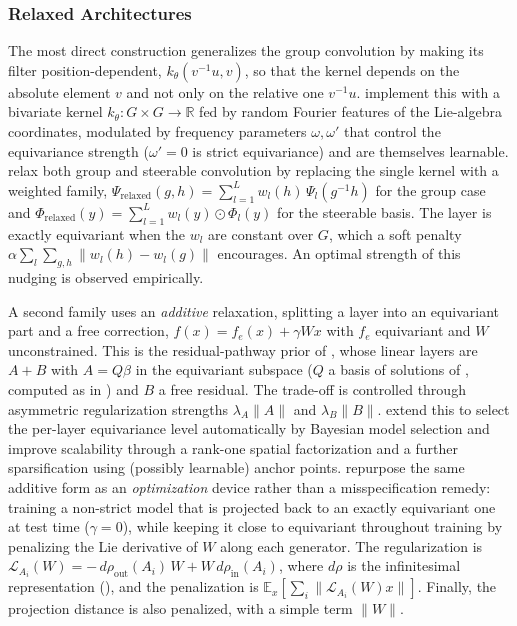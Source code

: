 \documentclass[mathematics,review,submit,moreauthors]{Definitions/mdpi}
\begin{document}
\subsubsection{Relaxed Architectures}\label{sec:approx-relaxed}
The most direct construction generalizes the group convolution by making its filter position-dependent, $k_\theta(v^{-1}u,v)$, so that the kernel depends on the absolute element $v$ and not only on the relative one $v^{-1}u$.
\citet{ouderaa2022} implement this with a bivariate kernel $k_\theta:G\times G\to\mathbb{R}$ fed by random Fourier features of the Lie-algebra coordinates, modulated by frequency parameters $\omega,\omega'$ that control the equivariance strength ($\omega'=0$ is strict equivariance) and are themselves learnable.
\citet{wang2022p3icml} relax both group and steerable convolution by replacing the single kernel with a weighted family, $\Psi_{\mathrm{relaxed}}(g,h)=\sum_{l=1}^{L}w_l(h)\,\Psi_l(g^{-1}h)$ for the group case and $\Phi_{\mathrm{relaxed}}(y)=\sum_{l=1}^{L}w_l(y)\odot\Phi_l(y)$ for the steerable basis.
The layer is exactly equivariant when the $w_l$ are constant over $G$, which a soft penalty $\alpha\sum_{l}\sum_{g,h}\|w_l(h)-w_l(g)\|$ encourages.
An optimal strength of this nudging is observed empirically.

A second family uses an \emph{additive} relaxation, splitting a layer into an equivariant part and a free correction, $f(x)=f_e(x)+\gamma Wx$ with $f_e$ equivariant and $W$ unconstrained.
This is the residual-pathway prior of \citet{finzi2021anips}, whose linear layers are $A+B$ with $A=Q\beta$ in the equivariant subspace ($Q$ a basis of solutions of , computed as in \citet{finzi2021p3icml}) and $B$ a free residual.
The trade-off is controlled through asymmetric regularization strengths $\lambda_A\|A\|$ and $\lambda_B\|B\|$.
\citet{ouderaa2023} extend this to select the per-layer equivariance level automatically by Bayesian model selection and improve scalability through a rank-one spatial factorization and a further sparsification using (possibly learnable) anchor points.
\citet{pertigkiozoglou2024} repurpose the same additive form as an \emph{optimization} device rather than a misspecification remedy: training a non-strict model that is projected back to an exactly equivariant one at test time ($\gamma=0$), while keeping it close to equivariant throughout training by penalizing the Lie derivative of $W$ along each generator.
The regularization is $\mathcal{L}_{A_i}(W)=-\,d\rho_{\mathrm{out}}(A_i)\,W+W\,d\rho_{\mathrm{in}}(A_i)$, where $d\rho$ is the infinitesimal representation (), and the penalization is $\mathbb{E}_x[\sum_i\|\mathcal{L}_{A_i}(W)x\|]$.
Finally, the projection distance is also penalized, with a simple term $\|W\|$.
 
\end{document}
